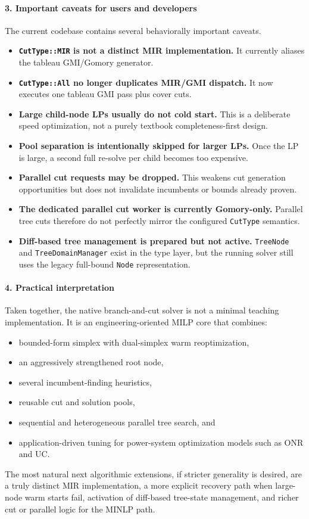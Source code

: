 \paragraph{3. Important caveats for users and developers}
The current codebase contains several behaviorally important caveats.
\begin{itemize}
  \item \textbf{\texttt{CutType::MIR} is not a distinct MIR implementation.} It currently aliases the tableau GMI/Gomory generator.
  \item \textbf{\texttt{CutType::All} no longer duplicates MIR/GMI dispatch.} It now executes one tableau GMI pass plus cover cuts.
  \item \textbf{Large child-node LPs usually do not cold start.} This is a deliberate speed optimization, not a purely textbook completeness-first design.
  \item \textbf{Pool separation is intentionally skipped for larger LPs.} Once the LP is large, a second full re-solve per child becomes too expensive.
  \item \textbf{Parallel cut requests may be dropped.} This weakens cut generation opportunities but does not invalidate incumbents or bounds already proven.
  \item \textbf{The dedicated parallel cut worker is currently Gomory-only.} Parallel tree cuts therefore do not perfectly mirror the configured \texttt{CutType} semantics.
  \item \textbf{Diff-based tree management is prepared but not active.} \texttt{TreeNode} and \texttt{TreeDomainManager} exist in the type layer, but the running solver still uses the legacy full-bound \texttt{Node} representation.
\end{itemize}

\paragraph{4. Practical interpretation}
Taken together, the native branch-and-cut solver is not a minimal teaching implementation. It is an engineering-oriented MILP core that combines:
\begin{itemize}
  \item bounded-form simplex with dual-simplex warm reoptimization,
  \item an aggressively strengthened root node,
  \item several incumbent-finding heuristics,
  \item reusable cut and solution pools,
  \item sequential and heterogeneous parallel tree search, and
  \item application-driven tuning for power-system optimization models such as ONR and UC.
\end{itemize}

The most natural next algorithmic extensions, if stricter generality is desired, are a truly distinct MIR implementation, a more explicit recovery path when large-node warm starts fail, activation of diff-based tree-state management, and richer cut or parallel logic for the MINLP path.
